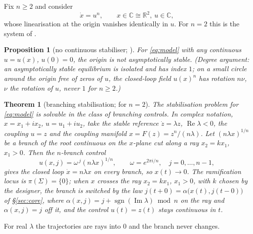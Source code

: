 \documentclass[11pt,reqno]{amsart}
\theoremstyle{plain}
\newtheorem*{theorem}{Theorem}
\newtheorem*{proposition}{Proposition}
\theoremstyle{definition}
\theoremstyle{remark}
\newcommand{\R}{\mathbb{R}}
\newcommand{\C}{\mathbb{C}}
\newcommand{\Sig}{\Sigma}
\begin{document}
Fix $n\ge2$ and consider
\begin{equation}\label{eq:model}
  \dot x = u^{n}, \qquad x\in\C\cong\R^{2},\ u\in\C,
\end{equation}
whose linearisation at the origin vanishes identically in $u$. For $n=2$ this is the
system of \cite[\S4]{Shosh1990}.

\begin{proposition}[no continuous stabiliser; {\cite[Prop.~4.1]{Shosh1990}}]
\label{prop:nostab}
For \eqref{eq:model} with any continuous $u=u(x)$, $u(0)=0$, the origin is not
asymptotically stable. \textup{(}Degree argument: an asymptotically stable equilibrium is
isolated and has index $1$; on a small circle around the origin free of zeros of $u$, the
closed-loop field $u(x)^{n}$ has rotation $n\nu$, $\nu$ the rotation of $u$, never $1$ for
$n\ge2$.\textup{)}
\end{proposition}

\begin{theorem}[branching stabilisation; {\cite[\S4]{Shosh1990}} for $n=2$]
\label{thm:stab}
The stabilisation problem for \eqref{eq:model} is solvable in the class of branching
controls. In complex notation, $x=x_1+ix_2$, $u=u_1+iu_2$, take the stable reference $\dot z=\lambda z$,
$\operatorname{Re}\lambda<0$, the coupling $u=z$ and the coupling manifold $x=F(z)=z^{n}/(n\lambda)$. Let $(n\lambda x)^{1/n}$ be a
branch of the root continuous on the $x$-plane cut along a ray $x_2=kx_1$, $x_1>0$. Then the $n$-branch control
\[
  u(x,j)=\omega^{\,j}(n\lambda x)^{1/n},\qquad \omega=e^{2\pi i/n},\quad j=0,\dots,n-1,
\]
gives the closed loop $\dot x=n\lambda x$ on every branch, so $x(t)\to0$. The ramification locus is
$\pi(\Sig)=\{0\}$; when $x$ crosses the ray $x_2=kx_1$, $x_1>0$, with $k$ chosen by the designer, the branch is
switched by the law $j(t+0)=\alpha\bigl(x(t),j(t-0)\bigr)$ of \S\ref{sec:core}, where
$\alpha(x,j)=j+\operatorname{sgn}(\operatorname{Im}\lambda)\bmod n$ on the ray and $\alpha(x,j)=j$ off it, and the control
$u(t)=z(t)$ stays continuous in $t$.
\end{theorem}

For real $\lambda$ the trajectories are rays into $0$ and the branch never changes.
\end{document}
